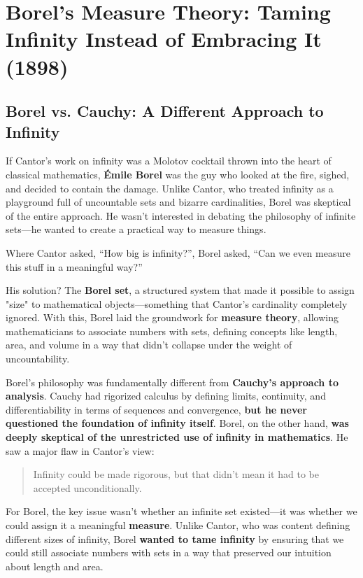 \section{Borel’s Measure Theory: Taming Infinity Instead of Embracing It (1898)}

\subsection{Borel vs. Cauchy: A Different Approach to Infinity}

If Cantor’s work on infinity was a Molotov cocktail thrown into the heart of classical mathematics, \textbf{Émile Borel} was the guy who looked at the fire, sighed, and decided to contain the damage. Unlike Cantor, who treated infinity as a playground full of uncountable sets and bizarre cardinalities, Borel was skeptical of the entire approach. He wasn’t interested in debating the philosophy of infinite sets—he wanted to create a practical way to measure things.

Where Cantor asked, “How big is infinity?”, Borel asked, “Can we even measure this stuff in a meaningful way?” 

His solution? The \textbf{Borel set}, a structured system that made it possible to assign "size" to mathematical objects—something that Cantor’s cardinality completely ignored. With this, Borel laid the groundwork for \textbf{measure theory}, allowing mathematicians to associate numbers with sets, defining concepts like length, area, and volume in a way that didn’t collapse under the weight of uncountability.

Borel’s philosophy was fundamentally different from \textbf{Cauchy’s approach to analysis}. Cauchy had rigorized calculus by defining limits, continuity, and differentiability in terms of sequences and convergence, \textbf{but he never questioned the foundation of infinity itself}. Borel, on the other hand, \textbf{was deeply skeptical of the unrestricted use of infinity in mathematics}. He saw a major flaw in Cantor’s view:

\begin{quote}
Infinity could be made rigorous, but that didn’t mean it had to be accepted unconditionally.
\end{quote}

For Borel, the key issue wasn’t whether an infinite set existed—it was whether we could assign it a meaningful \textbf{measure}. Unlike Cantor, who was content defining different sizes of infinity, Borel \textbf{wanted to tame infinity} by ensuring that we could still associate numbers with sets in a way that preserved our intuition about length and area.

